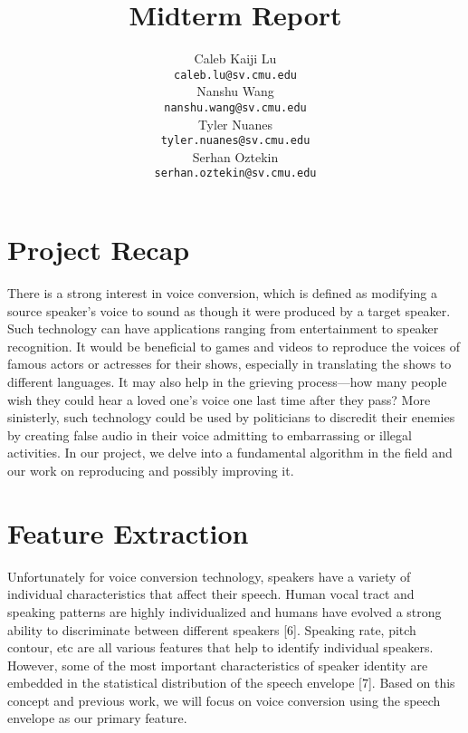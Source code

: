 \documentclass{article}
\title{Midterm Report}
\author{
  Caleb Kaiji Lu\\
  \texttt{caleb.lu@sv.cmu.edu} \\
  \And
  Nanshu Wang\\
  \texttt{nanshu.wang@sv.cmu.edu} \\
   \And
  Tyler Nuanes\\
  \texttt{tyler.nuanes@sv.cmu.edu} \\
  \And
   Serhan Oztekin\\
  \texttt{serhan.oztekin@sv.cmu.edu} \\
}
\begin{document}

\maketitle



\section{Project Recap}

There is a strong interest in voice conversion, which is defined as modifying a source speaker's voice to sound as though it were produced by a target speaker. Such technology can have applications ranging from entertainment to speaker recognition. It would be beneficial to games and videos to reproduce the voices of famous actors or actresses for their shows, especially in translating the shows to different languages. It may also help in the grieving process---how many people wish they could hear a loved one's voice one last time after they pass? More sinisterly, such technology could be used by politicians to discredit their enemies by creating false audio in their voice admitting to embarrassing or illegal activities. In our project, we delve into a fundamental algorithm in the field and our work on reproducing and possibly improving it.

\section{Feature Extraction}
Unfortunately for voice conversion technology, speakers have a variety of individual characteristics that affect their speech. Human vocal tract and speaking patterns are highly individualized and humans have evolved a strong ability to discriminate between different speakers [6].  Speaking rate, pitch contour, etc are all various features that help to identify individual speakers. However, some of the most important characteristics of speaker identity are embedded in the statistical distribution of the speech envelope [7]. Based on this concept and previous work, we will focus on voice conversion using the speech envelope as our primary feature.
 
\end{document}
